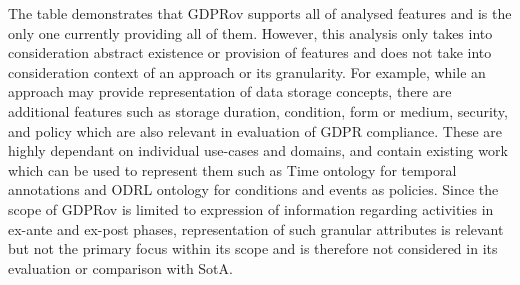 The table demonstrates that GDPRov supports all of analysed features and is the only one currently providing all of them. However, this analysis only takes into consideration abstract existence or provision of features and does not take into consideration context of an approach or its granularity. For example, while an approach may provide representation of data storage concepts, there are additional features such as storage duration, condition, form or medium, security, and policy which are also relevant in evaluation of GDPR compliance.
These are highly dependant on individual use-cases and domains, and contain existing work which can be used to represent them such as Time ontology \cite{cox_time_2017} for temporal annotations and ODRL ontology \cite{iannella_odrl_2018} for conditions and events as policies.
Since the scope of GDPRov is limited to expression of information regarding activities in ex-ante and ex-post phases, representation of such granular attributes is relevant but not the primary focus within its scope and is therefore not considered in its evaluation or comparison with SotA.
